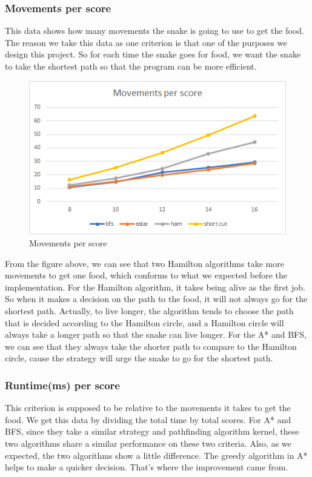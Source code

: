 \documentclass[12pt]{article}
\begin{document}
\subsubsection{Movements per score}
This data shows how many movements the snake is going to use to get the food. The reason we take this data as one criterion is that one of the purposes we design this project. So for each time the snake goes for food, we want the snake to take the shortest path so that the program can be more efficient. 

\begin{figure}[H]
    \centering 
    \includegraphics[scale = 0.9]{anay1.png}
    \caption{Movements per score}
\end{figure}

From the figure above, we can see that two Hamilton algorithms take more movements to get one food, which conforms to what we expected before the implementation. For the Hamilton algorithm, it takes being alive as the first job. So when it makes a decision on the path to the food, it will not always go for the shortest path. Actually, to live longer, the algorithm tends to choose the path that is decided according to the Hamilton circle, and a Hamilton circle will always take a longer path so that the snake can live longer. For the A* and BFS, we can see that they always take the shorter path to compare to the Hamilton circle, cause the strategy will urge the snake to go for the shortest path. 

\subsubsection{Runtime(ms) per score}

This criterion is supposed to be relative to the movements it takes to get the food. We get this data by dividing the total time by total scores. For A* and BFS, since they take a similar strategy and pathfinding algorithm kernel, these two algorithms share a similar performance on these two criteria. Also, as we expected, the two algorithms show a little difference. The greedy algorithm in A* helps to make a quicker decision. That's where the improvement came from. 
\end{document}

